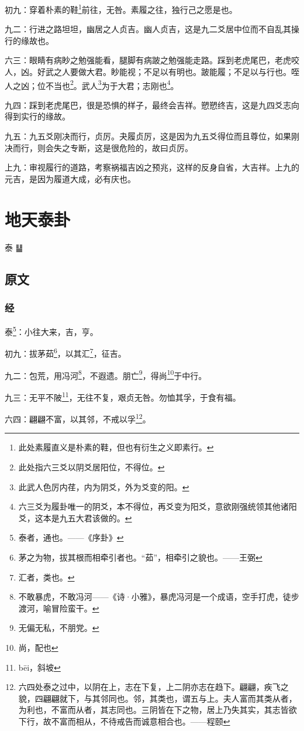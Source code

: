 \documentclass[12pt,oneside]{book}
\begin{document}
初九：穿着朴素的鞋\footnote{此处素履直义是朴素的鞋，但也有衍生之义即素行。}前往，无咎。素履之往，独行己之愿是也。

九二：行进之路坦坦，幽居之人贞吉。幽人贞吉，这是九二爻居中位而不自乱其操行的缘故也。

六三：眼睛有病眇之勉强能看，腿脚有病跛之勉强能走路。踩到老虎尾巴，老虎咬人，凶。好武之人要做大君。眇能视；不足以有明也。跛能履；不足以与行也。咥人之凶；位不当也\footnote{此处指六三爻以阴爻居阳位，不得位。}。武人\footnote{此武人色厉内荏，内为阴爻，外为爻变的阳。}为于大君；志刚也\footnote{六三爻为履卦唯一的阴爻，本不得位，再爻变为阳爻，意欲刚强统领其他诸阳爻，这本是九五大君该做的。}。

九四：踩到老虎尾巴，很是恐惧的样子，最终会吉祥。愬愬终吉，这是九四爻志向得到实行的缘故。

九五：九五爻刚决而行，贞厉。夬履贞厉，这是因为九五爻得位而且尊位，如果刚决而行，则会失之专断，这是很危险的，故曰贞厉。

上九：审视履行的道路，考察祸福吉凶之预兆，这样的反身自省，大吉祥。上九的元吉，是因为履道大成，必有庆也。



\chapter{地天泰卦}
泰 {\Large ䷊}

\section{原文}

\subsection{经}
泰\footnote{泰者，通也。——《序卦》}：小往大来，吉，亨。

初九：拔茅茹\footnote{茅之为物，拔其根而相牵引者也。“茹”，相牵引之貌也。——王弼}，以其汇\footnote{汇者，类也。}，征吉。

九二：包荒，用冯河\footnote{不敢暴虎，不敢冯河——《诗·小雅》，暴虎冯河是一个成语，空手打虎，徒步渡河，喻冒险蛮干。}，不遐遗。朋亡\footnote{无偏无私，不朋党。}，得尚\footnote{尚，配也}于中行。

九三：无平不陂\footnote{bēi，斜坡}，无往不复，艰贞无咎。勿恤其孚，于食有福。

六四：翩翩不富，以其邻，不戒以孚\footnote{六四处泰之过中，以阴在上，志在下复，上二阴亦志在趋下。翩翩，疾飞之貌，四翩翩就下，与其邻同也。邻，其类也，谓五与上。夫人富而其类从者，为利也，不富而从者，其志同也。三阴皆在下之物，居上乃失其实，其志皆欲下行，故不富而相从，不待戒告而诚意相合也。——程颐}。
\end{document}
